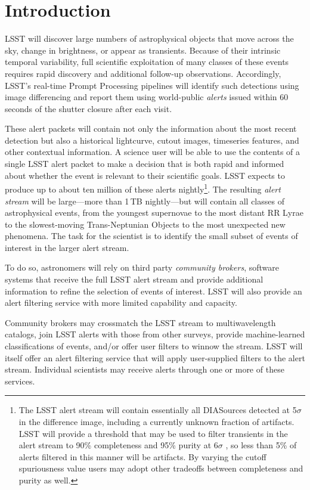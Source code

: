 \section{Introduction}\label{sec:introduction}

LSST will discover large numbers of astrophysical objects that move across the sky, change in brightness, or appear as transients.
Because of their intrinsic temporal variability, full scientific exploitation of many classes of these events requires rapid discovery and additional follow-up observations.
Accordingly, LSST's real-time Prompt Processing pipelines will identify such detections using image differencing and report them using world-public \textit{alerts} issued within 60 seconds of the shutter closure after each visit.

These alert packets will contain not only the information about the most recent detection but also a historical lightcurve, cutout images, timeseries features, and other contextual information.
A science user will be able to use the contents of a single LSST alert packet to make a decision that is both rapid and informed about whether the event is relevant to their scientific goals.
LSST expects to produce up to about ten million of these alerts nightly\footnote{The LSST alert stream will contain essentially all DIASources detected at 5$\sigma$ in the difference image, including a currently unknown fraction of artifacts.
LSST will provide a threshold that may be used to filter transients in the alert stream to 90\% completeness and 95\% purity at 6$\sigma$ , so less than 5\% of alerts filtered in this manner will be artifacts.
By varying the cutoff spuriousness value users may adopt other tradeoffs between completeness and purity as well.}.
The resulting \textit{alert stream} will be large---more than 1\,TB nightly---but will contain all classes of astrophysical events, from the youngest supernovae to the most distant RR Lyrae to the slowest-moving Trans-Neptunian Objects to the most unexpected new phenomena.
The task for the scientist is to identify the small subset of events of interest in the larger alert stream.

To do so, astronomers will rely on third party \textit{community brokers}, software systems that receive the full LSST alert stream and provide additional information to refine the selection of events of interest.
LSST will also provide an alert filtering service with more limited capability and capacity.

Community brokers may crossmatch the LSST stream to multiwavelength catalogs, join LSST alerts with those from other surveys, provide machine-learned classifications of events, and/or offer user filters to winnow the stream.
LSST will itself offer an alert filtering service that will apply user-supplied filters to the alert stream.
Individual scientists may receive alerts through one or more of these services.

